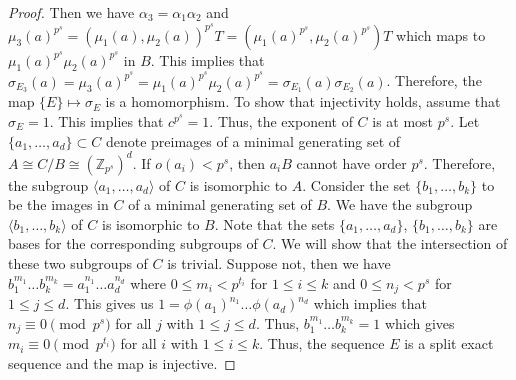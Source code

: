 \documentclass[preprint,sort&compress,12pt]{elsarticle}
\newtheorem{lemma}[theorem]{Lemma}
\numberwithin{equation}{section}
\theoremstyle{definition}
\begin{document}
\begin{proof}
    Then we have $\alpha_3=\alpha_1\alpha_2$ and $\mu_3(a)^{p^s}=(\mu_1(a),\mu_2(a))^{p^s}T=(\mu_1(a)^{p^s},\mu_2(a)^{p^s})T$ which maps to $ \mu_1(a)^{p^s}\mu_2(a)^{p^s}$ in $B$. This implies that $\sigma_{E_3}(a)=\mu_3(a)^{p^s}=\mu_1(a)^{p^s}\mu_2(a)^{p^s}=\sigma_{E_1}(a)\sigma_{E_2}(a)$. Therefore, the map $\{E\} \mapsto \sigma_E$ is a homomorphism. To show that injectivity holds, assume that $\sigma_E=1$. This implies that $c^{p^s}=1$. Thus, the exponent of $C$ is at most $p^s$. Let $\{a_1,\ldots,a_d\} \subset C$ denote preimages of a minimal generating set of  $A \cong C/B \cong (\mathbb{Z}_{p^s})^d$. If $o(a_i) < p^s$, then $a_iB$ cannot have order $p^s$. Therefore, the subgroup $\langle a_1,\ldots,a_d \rangle$ of $C$ is isomorphic to $A$. Consider the set $\{b_1,\ldots,b_k\}$ to be the images in $C$ of a minimal generating set of $B$. We have the subgroup $\langle b_1,\ldots,b_k \rangle$ of $C$ is isomorphic to $ B$. Note that the sets $\{ a_1,\ldots,a_d \}$, $\{b_1,\ldots,b_k\}$ are bases for the corresponding subgroups of $C$. We will show that the intersection of these two subgroups of $C$ is trivial. Suppose not, then we have $b_1^{m_1}\ldots b_k^{m_k}=a_1^{n_1}\ldots a_d^{n_d}$ where $0 \leq m_i < p^{t_i}$ for $1 \leq i\leq k$ and $0 \leq n_j < p^s$ for $1 \leq j \leq d$. This gives us $1=\phi(a_1)^{n_1}\ldots \phi(a_d)^{n_d}$ which implies that $n_j \equiv 0 \pmod {p^s}$ for all $j$ with $1 \leq j \leq d$. Thus, $b_1^{m_1}\ldots b_k^{m_k}=1$ which gives $m_i \equiv 0 \pmod {p^{t_i}}$ for all $i$ with $1\leq i \leq k$. Thus, the sequence $E$ is a split exact sequence and the map is injective. 
 \end{proof}

\end{document}
